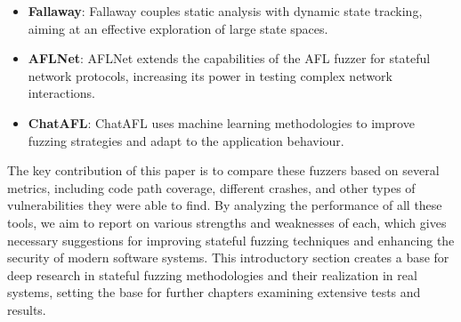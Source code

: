 \begin{itemize}
    \item \textbf{Fallaway}: Fallaway couples static analysis with dynamic state tracking, aiming at an effective exploration of large state spaces.
    \item \textbf{AFLNet}: AFLNet extends the capabilities of the AFL fuzzer for stateful network protocols, increasing its power in testing complex network interactions.
    \item \textbf{ChatAFL}: ChatAFL uses machine learning methodologies to improve fuzzing strategies and adapt to the application behaviour.
\end{itemize}
The key contribution of this paper is to compare these fuzzers based on several metrics, including code path coverage, different crashes, and other types of vulnerabilities they were able to find. By analyzing the performance of all these tools, we aim to report on various strengths and weaknesses of each, which gives necessary suggestions for improving stateful fuzzing techniques and enhancing the security of modern software systems. This introductory section creates a base for deep research in stateful fuzzing methodologies and their realization in real systems, setting the base for further chapters examining extensive tests and results.